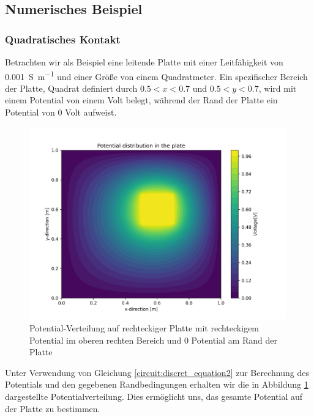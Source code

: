 \subsection{Numerisches Beispiel} 
\subsubsection{Quadratisches Kontakt}
Betrachten wir als Beispiel eine leitende Platte mit einer Leitfähigkeit von \SI{0.001}{\siemens\per\meter} und einer Größe von einem Quadratmeter. Ein spezifischer Bereich der Platte, Quadrat definiert durch $0.5 < x < 0.7$ und $0.5 < y < 0.7$, wird mit einem Potential von einem Volt belegt, während der Rand der Platte ein Potential von 0 Volt aufweist.

\begin{figure}
	\centering
	\includegraphics[width=0.99\textwidth]{papers/circuit/potential_distribution.png}
	\caption{Potential-Verteilung auf rechteckiger Platte mit rechteckigem Potential im oberen rechten Bereich und 0 Potential am Rand der Platte \cite{github:AndreasFMueller}}
	\label{fig:potential_distribution}
\end{figure}
Unter Verwendung von Gleichung \eqref{circuit:discret_equation2} zur Berechnung des Potentials und den gegebenen Randbedingungen erhalten wir die in Abbildung \ref{fig:potential_distribution} dargestellte Potentialverteilung. Dies ermöglicht uns, das gesamte Potential auf der Platte zu bestimmen.

